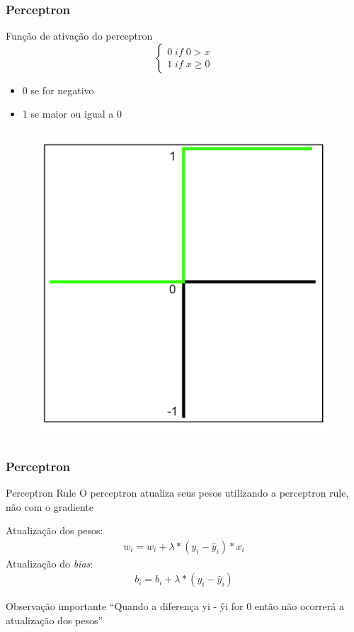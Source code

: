 \documentclass{beamer}
\begin{document}
\begin{frame}
	\frametitle{Perceptron}
	\begin{block}{Função de ativação do perceptron}
		$$
		\left\{\begin{matrix}
			0 \; if \; 0 > x
			\\ 
			1 \; if \; x \geq 0
		\end{matrix}\right.$$

		\begin{itemize}
			\item 0 se for negativo
			\item 1 se maior ou igual a 0
		\end{itemize}
	\end{block}
	
	\begin{figure}
		\centering
		\includegraphics[width=0.35\linewidth]{figures/step_function}
	\end{figure}
\end{frame}

\begin{frame}
	\frametitle{Perceptron}
		\begin{block}{Perceptron Rule}
			O perceptron atualiza seus pesos utilizando a perceptron rule, não com o gradiente
	\end{block}
Atualização dos pesos:
	\begin{gather*}
		w_i = w_i + \lambda*(y_i -  \hat{y}_i)* x_i
	\end{gather*}
	Atualização do \textit{bias}:
	\begin{gather*}
		b_i = b_i + \lambda*(y_i -  \hat{y}_i)
	\end{gather*}
\begin{alertblock}{Observação importante}
``Quando a diferença yi -  ŷi for 0 então não ocorrerá a atualização dos pesos''
\end{alertblock}

\end{frame}
\end{document}
